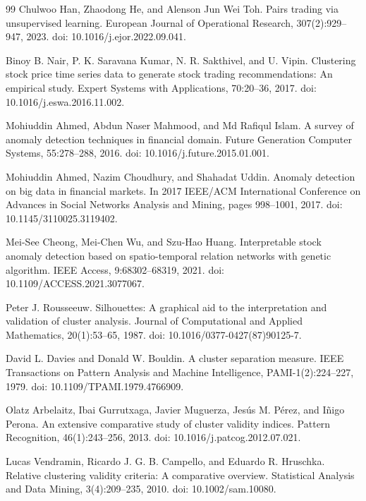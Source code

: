 \begin{thebibliography}{99}
 Chulwoo Han, Zhaodong He, and Alenson Jun Wei Toh. Pairs trading via unsupervised learning. European Journal of Operational Research, 307(2):929--947, 2023. doi: 10.1016/j.ejor.2022.09.041.

 Binoy B. Nair, P. K. Saravana Kumar, N. R. Sakthivel, and U. Vipin. Clustering stock price time series data to generate stock trading recommendations: An empirical study. Expert Systems with Applications, 70:20--36, 2017. doi: 10.1016/j.eswa.2016.11.002.

 Mohiuddin Ahmed, Abdun Naser Mahmood, and Md Rafiqul Islam. A survey of anomaly detection techniques in financial domain. Future Generation Computer Systems, 55:278--288, 2016. doi: 10.1016/j.future.2015.01.001.

 Mohiuddin Ahmed, Nazim Choudhury, and Shahadat Uddin. Anomaly detection on big data in financial markets. In 2017 IEEE/ACM International Conference on Advances in Social Networks Analysis and Mining, pages 998--1001, 2017. doi: 10.1145/3110025.3119402.

 Mei-See Cheong, Mei-Chen Wu, and Szu-Hao Huang. Interpretable stock anomaly detection based on spatio-temporal relation networks with genetic algorithm. IEEE Access, 9:68302--68319, 2021. doi: 10.1109/ACCESS.2021.3077067.

 Peter J. Rousseeuw. Silhouettes: A graphical aid to the interpretation and validation of cluster analysis. Journal of Computational and Applied Mathematics, 20(1):53--65, 1987. doi: 10.1016/0377-0427(87)90125-7.

 David L. Davies and Donald W. Bouldin. A cluster separation measure. IEEE Transactions on Pattern Analysis and Machine Intelligence, PAMI-1(2):224--227, 1979. doi: 10.1109/TPAMI.1979.4766909.

 Olatz Arbelaitz, Ibai Gurrutxaga, Javier Muguerza, Jes\'{u}s M. P\'{e}rez, and I\~{n}igo Perona. An extensive comparative study of cluster validity indices. Pattern Recognition, 46(1):243--256, 2013. doi: 10.1016/j.patcog.2012.07.021.

 Lucas Vendramin, Ricardo J. G. B. Campello, and Eduardo R. Hruschka. Relative clustering validity criteria: A comparative overview. Statistical Analysis and Data Mining, 3(4):209--235, 2010. doi: 10.1002/sam.10080.


\end{thebibliography}
